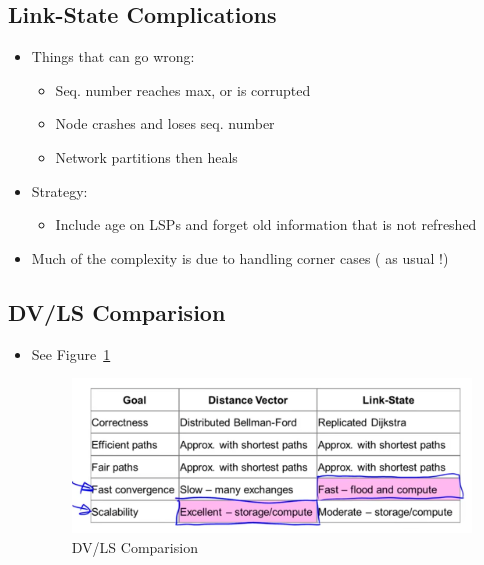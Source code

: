 \documentclass[12pt]{ctexart}   %
\begin{document}
	\subsection{Link-State Complications}
	\begin{itemize}
		\item Things that can go wrong:
		\begin{itemize}
			\item Seq. number reaches max, or is corrupted
			\item Node crashes and loses seq. number
			\item Network partitions then heals
		\end{itemize}
		
		\item Strategy:
		\begin{itemize}
			\item Include age on LSPs and forget old information that is not refreshed
		\end{itemize}
		
		\item Much of the complexity is due to handling corner cases ( as usual !)
	\end{itemize}
	
	\subsection{DV/LS Comparision}
	\begin{itemize}
		\item See Figure~\ref{fig:5-6-4}
			
		\begin{figure}[h!] %
		\centering
		 \includegraphics[scale=0.7]{images/5-6-4}
		\caption{ DV/LS Comparision }
		 \label{fig:5-6-4}
		 \end{figure}
	\end{itemize}
	
\end{document}
